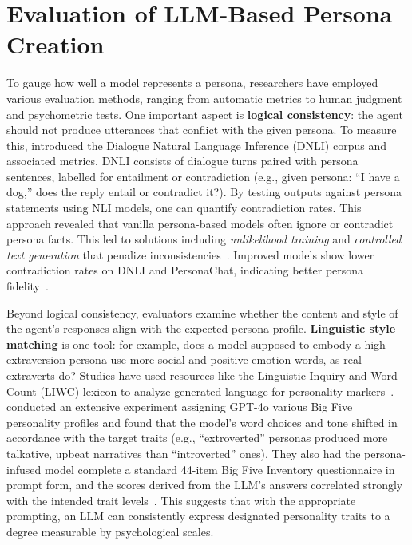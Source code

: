 \section{Evaluation of LLM-Based Persona Creation}
To gauge how well a model represents a persona, researchers have employed various evaluation methods, ranging from automatic metrics to human judgment and psychometric tests. One important aspect is \textbf{logical consistency}: the agent should not produce utterances that conflict with the given persona. To measure this, \citet{welleck-etal-2019-dialogueNLI} introduced the Dialogue Natural Language Inference (DNLI) corpus and associated metrics. DNLI consists of dialogue turns paired with persona sentences, labelled for entailment or contradiction (e.g., given persona: ``I have a dog,'' does the reply entail or contradict it?). By testing outputs against persona statements using NLI models, one can quantify contradiction rates. This approach revealed that vanilla persona-based models often ignore or contradict persona facts. This led to solutions including \emph{unlikelihood training} and \emph{controlled text generation} that penalize inconsistencies~\cite{li-etal-2020-dont, kim-etal-2020-will}. Improved models show lower contradiction rates on DNLI and PersonaChat, indicating better persona fidelity~\cite{kim-etal-2020-will}.

Beyond logical consistency, evaluators examine whether the content and style of the agent's responses align with the expected persona profile. \textbf{Linguistic style matching} is one tool: for example, does a model supposed to embody a high-extraversion persona use more social and positive-emotion words, as real extraverts do? Studies have used resources like the Linguistic Inquiry and Word Count (LIWC) lexicon to analyze generated language for personality markers~\cite{jiang-etal-2023-personallm}. \citet{jiang-etal-2023-personallm} conducted an extensive experiment assigning GPT-4o various Big Five personality profiles and found that the model's word choices and tone shifted in accordance with the target traits (e.g., ``extroverted'' personas produced more talkative, upbeat narratives than ``introverted'' ones). They also had the persona-infused model complete a standard 44-item Big Five Inventory questionnaire in prompt form, and the scores derived from the LLM's answers correlated strongly with the intended trait levels~\cite{jiang-etal-2023-personallm}. This suggests that with the appropriate prompting, an LLM can consistently express designated personality traits to a degree measurable by psychological scales.

